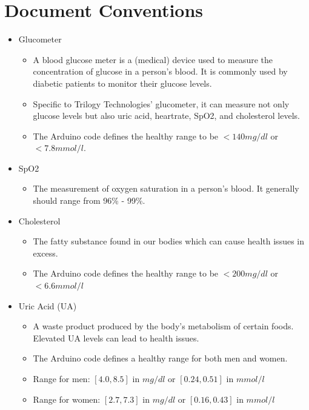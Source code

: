 \documentclass[a4paper]{scrreprt}
\begin{document}
\section{Document Conventions}\begin{itemize}

  \item Glucometer
  \begin{itemize}
    \item A blood glucose meter is a (medical) device used to measure the concentration of glucose in a person’s blood. It is commonly used by diabetic patients to monitor their glucose levels.
    \item Specific to Trilogy Technologies’ glucometer, it can measure not only glucose levels but also uric acid, heartrate, SpO2, and cholesterol levels.
    \item The Arduino code defines the healthy range to be $<140mg/dl$ or $<7.8mmol/l$.
  \end{itemize}
  
  \item SpO2
  \begin{itemize}
    \item The measurement of oxygen saturation in a person’s blood. It generally should range from 96\% - 99\%.
  \end{itemize}

  \item Cholesterol
  \begin{itemize}
      \item The fatty substance found in our bodies which can cause health issues in excess.
      \item The Arduino code defines the healthy range to be $<200mg/dl$ or $<6.6mmol/l$
  \end{itemize}

  \item Uric Acid (UA)
  \begin{itemize}
      \item A waste product produced by the body's metabolism of certain foods. Elevated UA levels can lead to health issues.
      \item The Arduino code defines a healthy range for both men and women.
      \item Range for men: $[4.0, 8.5]$ in $mg/dl$ or $[0.24, 0.51]$ in $mmol/l$
      \item Range for women: $[2.7, 7.3]$ in $mg/dl$ or $[0.16, 0.43]$ in $mmol/l$
  \end{itemize}


\end{itemize}
\end{document}
